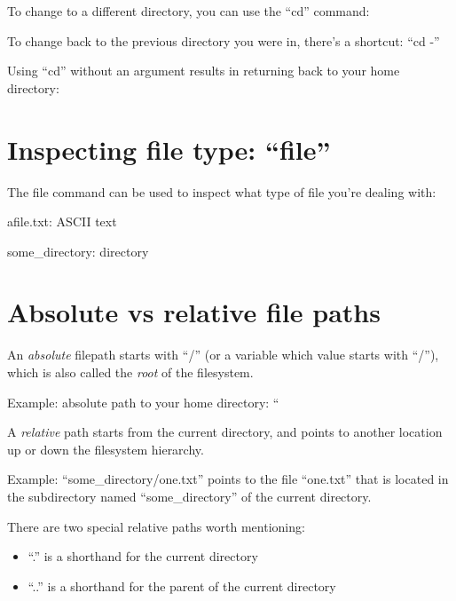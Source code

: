 To change to a different directory, you can use the ``cd'' command:

\begin{prompt}
\end{prompt}

To change back to the previous directory you were in, there's a shortcut: ``cd -''

Using ``cd'' without an argument results in returning back to your home directory:

\begin{prompt}
\end{prompt}

\section{Inspecting file type: ``file''}

The file command can be used to inspect what type of file you're dealing with:

\begin{prompt}
afile.txt: ASCII text

some_directory: directory
\end{prompt}

\section{Absolute vs relative file paths}

An \emph{absolute} filepath starts with ``/'' (or a variable which value starts
with ``/''), which is also called the \emph{root} of the filesystem.

Example: absolute path to your home directory:
``%

A \emph{relative} path starts from the current directory, and points to another
location up or down the filesystem hierarchy.

Example: ``some\_directory/one.txt'' points to the file ``one.txt'' that is
located in the subdirectory named ``some\_directory'' of the current directory.

There are two special relative paths worth mentioning:

\begin{itemize}
    \item ``.'' is a shorthand for the current directory
    \item ``..'' is a shorthand for the parent of the current directory
\end{itemize}

